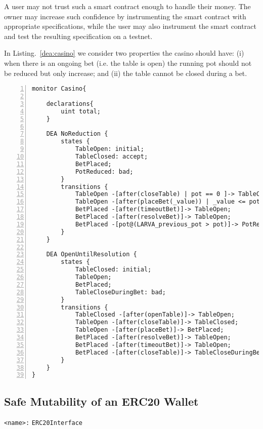 \documentclass{article}
\newcommand{\tildearrow}{{\raise.37ex\hbox{$\scriptstyle\mathtt{\sim}$}}\hspace{-0.08cm}>\xspace}
\begin{document}
      A user may not trust such a smart contract enough to handle their money. The owner may increase such confidence by instrumenting the smart contract with appropriate specifications, while the user may also instrument the smart contract and test the resulting specification on a testnet.
      
      In Listing.~\ref{dea:casino} we consider two properties the casino should have: (i) when there is an ongoing bet (i.e. the table is open) the running pot should not be reduced but only increase; and (ii) the table cannot be closed during a bet.
      
        \small\begin{lstlisting}[language=DEA,basicstyle=\scriptsize,numbers=left,numbersep=2pt,xleftmargin=0.3cm,escapechar=\%,label={dea:casino}]
monitor Casino{

    declarations{
        uint total;
    }

    DEA NoReduction {
        states {
            TableOpen: initial;
            TableClosed: accept;
            BetPlaced;
            PotReduced: bad;
        }
        transitions {
            TableOpen -[after(closeTable) | pot == 0 ]-> TableClosed;
            TableOpen -[after(placeBet(_value)) | _value <= pot %$\tildearrow$% total += _value;]-> BetPlaced;
            BetPlaced -[after(timeoutBet)]-> TableOpen;
            BetPlaced -[after(resolveBet)]-> TableOpen;
            BetPlaced -[pot@(LARVA_previous_pot > pot)]-> PotReduced;
        }
    }
    
    DEA OpenUntilResolution {
        states {
            TableClosed: initial;
            TableOpen;
            BetPlaced;
            TableCloseDuringBet: bad;
        }
        transitions {
            TableClosed -[after(openTable)]-> TableOpen;
            TableOpen -[after(closeTable)]-> TableClosed;
            TableOpen -[after(placeBet)]-> BetPlaced;
            BetPlaced -[after(resolveBet)]-> TableOpen;
            BetPlaced -[after(timeoutBet)]-> TableOpen;
            BetPlaced -[after(closeTable)]-> TableCloseDuringBet;
        }
    }
}
        \end{lstlisting}\normalsize
        
        
 \subsection{Safe Mutability of an ERC20 Wallet}
 
        \texttt{<name>:} \verb+ERC20Interface+\\
 
\end{document}
